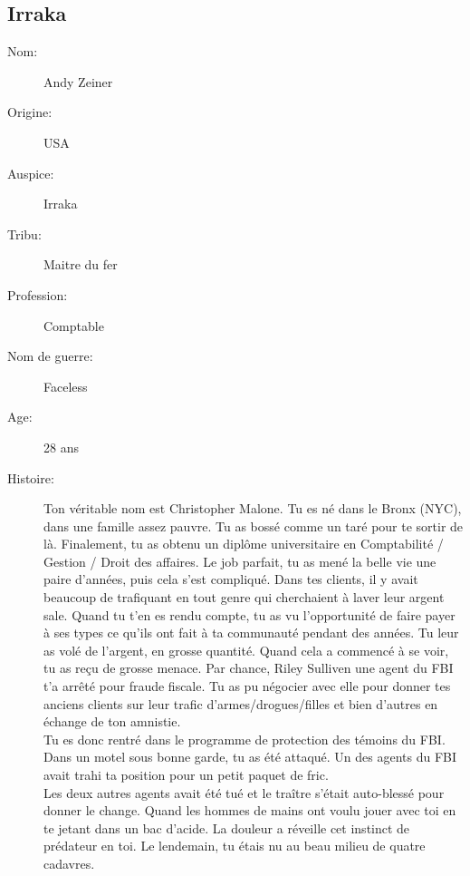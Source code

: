 \documentclass[oneside,12pt]{book}
\begin{document}
\begin{flushleft}
\clearpage


\section{Irraka}
\begin{description}
\item[Nom:]{Andy Zeiner}
\item[Origine:]{USA}
\item[Auspice:]{Irraka}
\item[Tribu:]{Maitre du fer}
\item[Profession:]{Comptable}
\item[Nom de guerre:]{Faceless}
\item[Age:]{28 ans}
\item[Histoire:]{
{\footnotesize Ton véritable nom est Christopher Malone. Tu es né dans le Bronx (NYC), dans une famille assez pauvre. Tu as bossé comme un taré pour te sortir de là. Finalement, tu as obtenu un diplôme universitaire en
Comptabilité / Gestion / Droit des affaires. Le job parfait, tu as mené la belle vie une paire d'années, puis cela s'est compliqué. Dans tes clients, il y avait beaucoup de trafiquant en tout genre qui
cherchaient à laver leur argent sale.
Quand tu t'en es rendu compte, tu as vu l'opportunité de faire payer à ses types ce qu'ils ont fait à ta communauté pendant des années. Tu leur as volé de l'argent, en grosse quantité.
Quand cela a commencé à se voir, tu as reçu de grosse menace. Par chance, Riley Sulliven une agent du FBI t'a arrêté pour fraude fiscale. Tu as pu négocier avec elle pour donner tes anciens clients sur
leur trafic d'armes/drogues/filles et bien d'autres en échange de ton amnistie.\\
Tu es donc rentré dans le programme de protection des témoins du FBI. Dans un motel sous bonne garde, tu as été attaqué. Un des agents du FBI avait trahi ta position pour un petit paquet de fric.\\
Les deux autres agents avait été tué et le traître s'était auto-blessé pour donner le change. Quand les hommes de mains ont voulu jouer avec toi en te jetant dans un bac d'acide. La douleur a réveille cet instinct de prédateur en toi. Le lendemain, tu étais nu au beau milieu de quatre cadavres.\\
}}
\end{description}
\end{flushleft}
\end{document}
